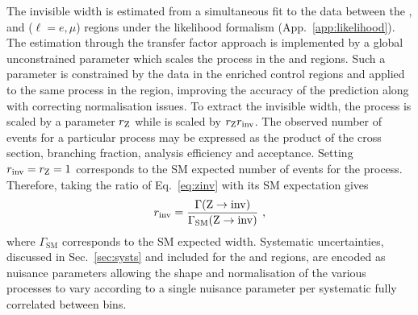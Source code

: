 The \PZ invisible width is estimated from a simultaneous fit to the data between the \metplusjets, \diellplusjets and \ellplusjets ($\ell=e,\mu$) regions under the likelihood formalism (App.~\ref{app:likelihood}). The \IWj estimation through the transfer factor approach is implemented by a global unconstrained parameter which scales the \IWj process in the \metplusjets and \ellplusjets regions. Such a parameter is constrained by the data in the \IWj enriched control regions and applied to the same process in the \metplusjets region, improving the accuracy of the prediction along with correcting normalisation issues. To extract the invisible width, the \IZllj process is scaled by a parameter $r_\mathrm{Z}$ while \IZvvj is scaled by $r_\mathrm{Z} r_{{\mathrm{inv}}}$. The observed number of events for a particular process may be expressed as the product of the cross section, branching fraction, analysis efficiency and acceptance.  Setting $r_{\mathrm{inv}}=r_\mathrm{Z}=1$ corresponds to the SM expected number of events for the process. Therefore, taking the ratio of Eq.~\ref{eq:zinv} with its SM expectation gives
%
\begin{equation}
    r_{\mathrm{inv}} = \frac{\Gamma(\mathrm{Z}\rightarrow{\mathrm{inv}})}{\Gamma_{\mathrm{SM}}(\mathrm{Z}\rightarrow{\mathrm{inv}})}\ ,
\end{equation}
%
where $\Gamma_{\mathrm{SM}}$ corresponds to the SM expected width. Systematic uncertainties, discussed in Sec.~\ref{sec:systs} and included for the \ptmissplusjets and \diellplusjets regions, are encoded as nuisance parameters allowing the shape and normalisation of the various processes to vary according to a single nuisance parameter per systematic fully correlated between \recoil bins.


